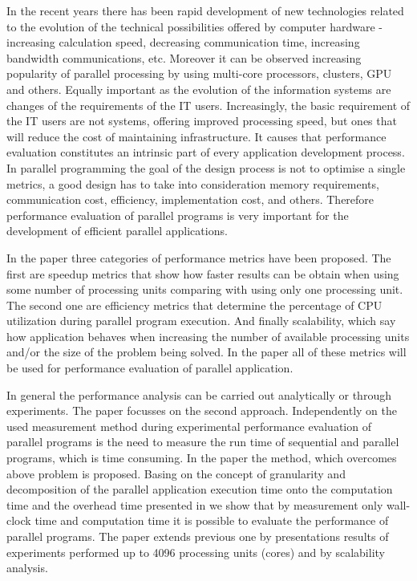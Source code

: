 \documentclass[runningheads]{llncs}
\begin{document}
In the recent years there has been rapid development of new technologies related to the evolution of the technical possibilities offered by computer hardware - increasing calculation speed, decreasing communication time, increasing bandwidth communications, etc. Moreover it can be observed increasing popularity of parallel processing by using multi-core processors, clusters, GPU and others. Equally important as the evolution of the information systems are changes of the requirements of the IT users. Increasingly, the basic requirement of the IT users are not systems, offering improved processing speed, but ones that will reduce the cost of maintaining infrastructure. It causes that performance evaluation constitutes an intrinsic part of every application development process. In parallel programming the goal of the design process is not to optimise a single metrics, a good design has to take into consideration memory requirements, communication cost, efficiency, implementation cost, and others. Therefore performance evaluation of parallel programs is very important for the development of efficient parallel applications. 

In the paper \cite{jogalekar} three categories of performance metrics have been proposed. The first are speedup metrics that show how faster results can be obtain when using some number of processing units comparing with using only one processing unit. The second one are efficiency metrics that determine the percentage of  CPU utilization during parallel program execution. And finally scalability, which say how application behaves when increasing the number of available processing units and/or the size of the problem being solved. In the paper all of these metrics will be used for performance evaluation of parallel application.
  
In general the performance analysis can be carried out analytically or through experiments. The paper focusses on the second approach. Independently on the used measurement method during experimental performance evaluation of parallel programs is the need to measure the run time of sequential and parallel programs, which is time consuming. In the paper the method, which overcomes above problem is proposed. Basing on the concept of granularity and decomposition of the parallel application execution time onto the computation time and the overhead time presented in \cite{kwiatkowski_2,kwiatkowski_3} we show that by measurement only wall-clock time and computation time it is possible to evaluate the performance of parallel programs. The paper extends previous one by presentations results of experiments performed up to 4096 processing units (cores) and by scalability analysis.
\end{document}
